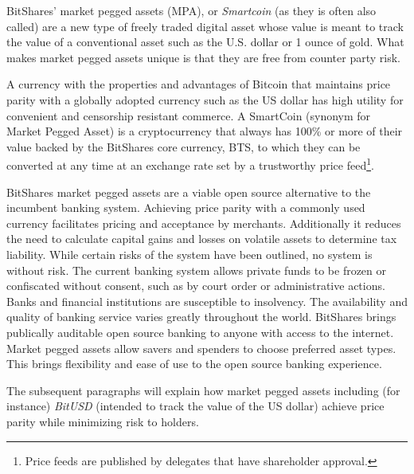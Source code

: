 BitShares' market pegged assets (MPA), or \emph{Smartcoin} (as they is often also
called) are a new type of freely traded digital asset whose value is meant to
track the value of a conventional asset such as the U.S. dollar or 1 ounce
of gold. What makes market pegged assets unique is that they are free from
counter party risk.

A currency with the properties and advantages of Bitcoin that maintains price
parity with a globally adopted currency such as the US dollar has high utility
for convenient and censorship resistant commerce. A SmartCoin (synonym for
Market Pegged Asset) is a cryptocurrency that always has 100\% or more of
their value backed by the BitShares core currency, BTS, to which they can be
converted at any time at an exchange rate set by a trustworthy price
feed\footnote{Price feeds are published by delegates that have shareholder
approval.}. 

BitShares market pegged assets are a viable open source alternative to the
incumbent banking system. Achieving price parity with a commonly used currency
facilitates pricing and acceptance by merchants. Additionally it reduces the
need to calculate capital gains and losses on volatile assets to determine tax
liability. While certain risks of the system have been outlined, no system is
without risk. The current banking system allows private funds to be frozen or
confiscated without consent, such as by court order or administrative actions.
Banks and financial institutions are susceptible to insolvency. The
availability and quality of banking service varies greatly throughout the
world. BitShares brings publically auditable open source banking to anyone with
access to the internet. Market pegged assets allow savers and spenders to
choose preferred asset types. This brings flexibility and ease of use to the
open source banking experience.
 
The subsequent paragraphs will explain how market pegged assets including (for
instance) \emph{BitUSD} (intended to track the value of the US dollar)
achieve price parity while minimizing risk to holders.
